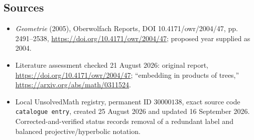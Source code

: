 \documentclass[11pt]{article}
\begin{document}
\subsection{Sources}
\begin{itemize}
\item \emph{Geometrie} (2005), Oberwolfach Reports, DOI 10.4171/owr/2004/47, pp. 2491--2538, \url{https://doi.org/10.4171/owr/2004/47}; proposed year supplied as 2004.
\item Literature assessment checked 21 August 2026: original report, \url{https://doi.org/10.4171/owr/2004/47}; ``embedding in products of trees,'' \url{https://arxiv.org/abs/math/0311524}.
\item Local UnsolvedMath registry, permanent ID $30000138$, exact source code \texttt{catalogue entry}, created 25 August 2026 and updated 16 September 2026. Corrected-and-verified status records removal of a redundant label and balanced projective/hyperbolic notation.
\end{itemize}
\end{document}
